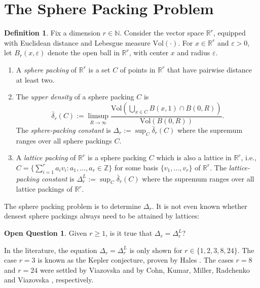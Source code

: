 \documentclass[12pt]{article}
\numberwithin{equation}{section}
\theoremstyle{definition}
\newtheorem{definition}{Definition}
\newtheorem{openquestion}[theorem]{Open Question}
\newcommand{\ev}[1]{( #1 )}
\newcommand{\ew}[1]{\left( #1 \right)}
\newcommand{\N}{\mathbb{N}}
\newcommand{\Z}{\mathbb{Z}}
\newcommand{\R}{\mathbb{R}}
\begin{document}
\section*{The Sphere Packing Problem}

\begin{definition} 
Fix a dimension $r \in \N$. Consider the vector space $\R^r$, equipped with Euclidean distance and Lebesgue measure $\mathrm{Vol}(\cdot)$. For $x \in \R^r$ and $\varepsilon >0$, let $B_r\ev{x,\varepsilon}$ denote the open ball in $\R^r$, with center $x$ and radius $\varepsilon$. 
\begin{enumerate}
\item A \emph{sphere packing} of $\R^r$ is a set $C$ of points in $\R^r$ that have pairwise distance at least two. 
\item The \emph{upper density} of a sphere packing $C$ is
$$
\bar\delta_r\ev{C} := \limsup_{R \to \infty} \frac{\mathrm{Vol}\!\ew{\textstyle\bigcup_{x \in C} B\ev{x,1} \cap B\ev{0,R}}}{\mathrm{Vol}\!\ew{B\ev{0,R}}}.
$$
The \emph{sphere-packing constant} is $\Delta_r := \sup_C \bar\delta_r\ev{C}$ where the supremum ranges over all sphere packings $C$. 

\item A \textit{lattice packing} of $\R^r$ is a sphere packing $C$ which is also a lattice in $\R^r$, i.e., $C = \{ \sum_{i=1}^{r} a_i v_i : a_1,\ldots, a_r \in \Z \} $ for some basis $\{ v_1, \dots, v_r \}$ of $\R^r$. The \emph{lattice-packing constant} is $\Delta_r^{L} := \sup_C \bar\delta_r\ev{C}$ where the supremum ranges over all lattice packings of $\R^r$.
\end{enumerate}
\end{definition}

The sphere packing problem is to determine $\Delta_r$. It is not even known whether densest sphere packings always need to be attained by lattices:

\begin{openquestion}
Given $r\geq 1$, is it true that $\Delta_r = \Delta_r^{L}$?
\end{openquestion}

In the literature, the equation $\Delta_r = \Delta_r^{L}$ is only shown for $r \in \{1,2,3,8,24\}$. The case $r=3$ is known as the Kepler conjecture, proven by  Hales \cite{hales2005kepler}. The cases $r = 8$ and $r = 24$ were settled by Viazovska \cite{viazovska2017eight} and by Cohn, Kumar, Miller, Radchenko and Viazovska \cite{cohn2017twentyfour}, respectively. 

\printbibliography
\end{document}
